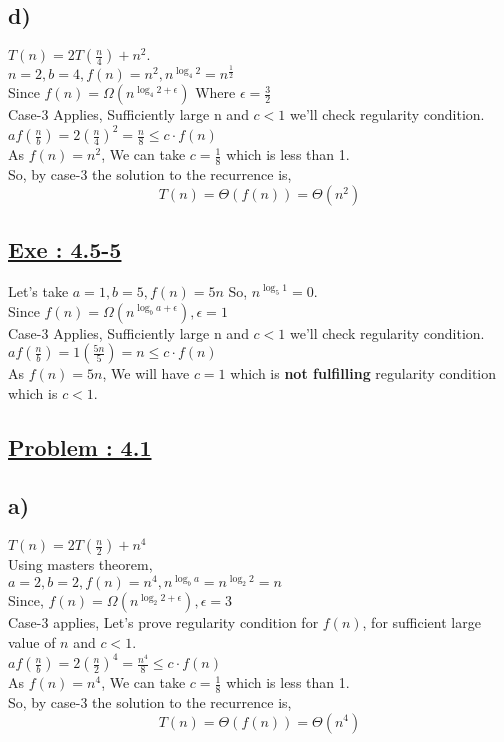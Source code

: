 \documentclass[a4paper, 11pt]{article}
\begin{document}
\subsection*{d)}
$T(n) = 2T(\frac{n}{4}) + n^2 .$\\
$ n=2, b=4, f(n)=n^2,n^{\log_{4}2}=n^{\frac{1}{2}} $\\
Since $f(n) = \Omega(n^{\log_{4}2 + \epsilon})$ Where $\epsilon=\frac{3}{2}$\\
Case-3 Applies, Sufficiently large n and $c<1$ we'll check regularity condition.\\
$af(\frac{n}{b}) = 2(\frac{n}{4})^2 = \frac{n}{8} \le c \cdot f(n)$\\
As $f(n)=n^2$, We can take $c=\frac{1}{8}$ which is less than 1.\\
So, by case-3 the solution to the recurrence is,
$$T(n) = \Theta (f(n)) = \Theta(n^2)$$

\subsection*{\underline{Exe : 4.5-5}}
Let's take $a=1, b=5, f(n)= 5n$ So, $n^{\log_{5}1} = 0$.\\
Since $f(n) = \Omega(n^{\log_{b}a + \epsilon}) , \epsilon = 1$\\
Case-3 Applies, Sufficiently large n and $c<1$ we'll check regularity condition.\\
$af(\frac{n}{b}) = 1(\frac{5n}{5}) = n \le c \cdot f(n)$\\
As $f(n)= 5n$, We will have $c=1$ which is\textbf{ not fulfilling }regularity condition which is $c<1$.

\subsection*{\underline{Problem : 4.1}}
\subsection*{a)}
$T(n) = 2T(\frac{n}{2}) + n^4$\\
Using masters theorem,\\
$a=2, b=2, f(n) = n^4, n^{\log_{b}a}=n^{\log_{2}2}=n$\\
Since, $f(n) = \Omega(n^{\log_{2}2 + \epsilon}), \epsilon=3$\\
Case-3 applies, Let's prove regularity condition for $f(n)$, for sufficient large value of $n$ and $c<1$.\\
$af(\frac{n}{b}) = 2(\frac{n}{2})^4 = \frac{n^4}{8} \le c \cdot f(n)$\\
As $f(n)=n^4$, We can take $c=\frac{1}{8}$ which is less than 1.\\
So, by case-3 the solution to the recurrence is,
$$T(n) = \Theta (f(n)) = \Theta(n^4)$$
\end{document}
